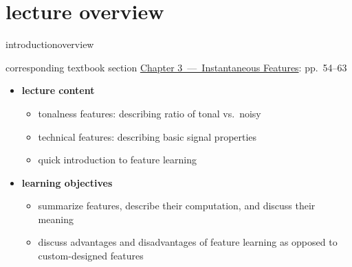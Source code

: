     \section[overview]{lecture overview}
        \begin{frame}{introduction}{overview}
            \begin{block}{corresponding textbook section}
                    \href{http://ieeexplore.ieee.org/xpl/articleDetails.jsp?arnumber=6331120}{Chapter 3~---~Instantaneous Features}: pp.~54--63
            \end{block}

            \begin{itemize}
                \item   \textbf{lecture content}
                    \begin{itemize}
                        \item   tonalness features: describing ratio of tonal vs.\ noisy   
                        \item   technical features: describing basic signal properties
                        \item   quick introduction to feature learning
                    \end{itemize}
                \bigskip
                \item<2->   \textbf{learning objectives}
                    \begin{itemize}
                        \item   summarize features, describe their computation, and discuss their meaning
                        \item   discuss advantages and disadvantages of feature learning as opposed to custom-designed features
                    \end{itemize}
            \end{itemize}
        \end{frame}

